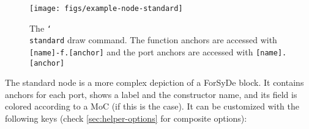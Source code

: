 \documentclass[10pt]{article}
\newcommand\bookmark[1]{\marginpar{\ttfamily #1}}
\def\opt#1{\color{gray}{#1}}
\def\man#1{\color{black}{#1}}
\begin{document}
\begin{figure}[htb]\centering
\texttt{[image: figs/example-node-standard]}

\caption{The \texttt{\char`\\standard} draw command. The function anchors are accessed with \texttt{[name]-f.[anchor]} and the port anchors are accessed with \texttt{[name].[anchor]}}
\end{figure}
\hspace{1pt}\bookmark{\char`\\standard\opt{[options]}\opt{(name)}\opt{<position>}\man{\{label\}};}

\noindent The standard node is a more complex depiction of a ForSyDe block. It contains anchors for each port, shows a label and the constructor name, and its field is colored according to a MoC (if this is the case). It can be customized with the following keys (check \ref{sec:helper-options} for composite options):
\end{document}
